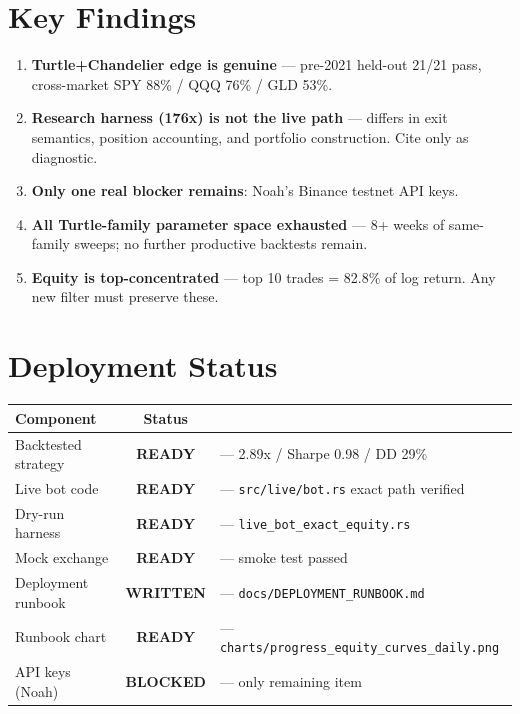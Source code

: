 \documentclass[12pt,a4paper]{article}
\begin{document}
\section{Key Findings}

\begin{enumerate}
  \item \textbf{Turtle+Chandelier edge is genuine} — pre-2021 held-out 21/21 pass, cross-market
        SPY 88\% / QQQ 76\% / GLD 53\%.
  \item \textbf{Research harness (176x) is not the live path} — differs in exit semantics,
        position accounting, and portfolio construction. Cite only as diagnostic.
  \item \textbf{Only one real blocker remains}: Noah's Binance testnet API keys.
  \item \textbf{All Turtle-family parameter space exhausted} — 8+ weeks of same-family
        sweeps; no further productive backtests remain.
  \item \textbf{Equity is top-concentrated} — top 10 trades = 82.8\% of log return.
        Any new filter must preserve these.
\end{enumerate}

\section{Deployment Status}

\begin{center}
\small
\begin{tabular}{lcl}
\textbf{Component} & \textbf{Status} \\ \midrule
Backtested strategy & \textbf{READY} & — 2.89x / Sharpe 0.98 / DD 29\% \\
Live bot code & \textbf{READY} & — \texttt{src/live/bot.rs} exact path verified \\
Dry-run harness & \textbf{READY} & — \texttt{live\_bot\_exact\_equity.rs} \\
Mock exchange & \textbf{READY} & — smoke test passed \\
Deployment runbook & \textbf{WRITTEN} & — \texttt{docs/DEPLOYMENT\_RUNBOOK.md} \\
Runbook chart & \textbf{READY} & — \texttt{charts/progress\_equity\_curves\_daily.png} \\
API keys (Noah) & \textbf{BLOCKED} & — only remaining item \\
\end{tabular}
\end{center}
\end{document}
